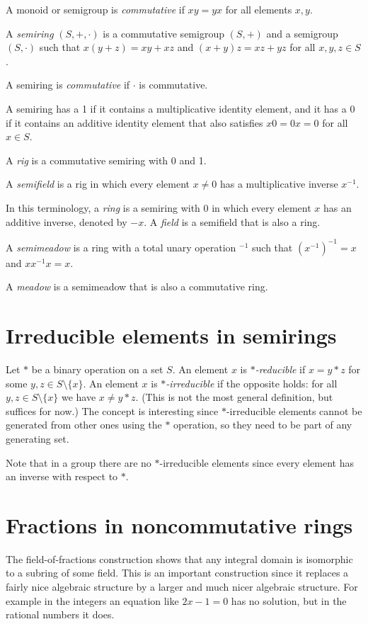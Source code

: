 \documentclass{amsart}
\begin{document}
A monoid or semigroup is \textit{commutative} if $xy=yx$ for all elements $x,y$.

A \textit{semiring} $(S,+,\cdot)$ is a commutative semigroup $(S,+)$ and a semigroup $(S,\cdot)$ such that $x(y+z)=xy+xz$ and $(x+y)z=xz+yz$ for all $x,y,z\in S$.

A semiring is \textit{commutative} if $\cdot$ is commutative.

A semiring has a 1 if it contains a multiplicative identity element, and it has a $0$ if it contains an additive identity element that also satisfies $x0=0x=0$ for all $x\in S$.

A \textit{rig} is a commutative semiring with 0 and 1.

A \textit{semifield} is a rig in which every element $x\ne 0$ has a multiplicative inverse $x^{-1}$.

In this terminology, a \textit{ring} is a semiring with $0$ in which every element $x$ has an additive inverse, denoted by $-x$. A \textit{field} is a semifield that is also a ring.

A \textit{semimeadow} is a ring with a total unary operation $^{-1}$ such that $(x^{-1})^{-1}=x$ and $xx^{-1}x=x$.

A \textit{meadow} is a semimeadow that is also a commutative ring.

\section{Irreducible elements in semirings}
Let $*$ be a binary operation on a set $S$. 
An element $x$ is \textit{$*$-reducible} if $x=y*z$ for some $y,z\in S\setminus\{x\}$. 
An element $x$ is \textit{$*$-irreducible} if the opposite holds: for all $y,z\in S\setminus \{x\}$ we have $x\ne y*z$. 
(This is not the most general definition, but suffices for now.)
The concept is interesting since $*$-irreducible elements cannot be generated from other ones using the $*$ operation, so they need to be part of any generating set. 

Note that in a group there are no $*$-irreducible elements since every element has an inverse with respect to $*$.

\section{Fractions in noncommutative rings}
The field-of-fractions construction shows that any integral domain is isomorphic to a subring of some field. This is an important construction since it replaces a fairly nice algebraic structure by a larger and much nicer algebraic structure. For example in the integers an equation like $2x-1=0$ has no solution, but in the rational numbers it does.
\end{document}
